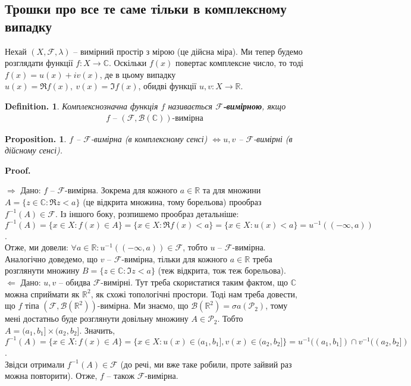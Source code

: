 \documentclass[a4paper, 10pt]{article}
\makeatletter
\def\rightproof{$\boxed{\Rightarrow}$ }
\def\leftproof{$\boxed{\Leftarrow}$ }
\theoremstyle{theoremdd}
\newtheorem*{definition*}{Definition.}
\newtheorem*{proposition*}{Proposition.}
\renewenvironment{proof}[1][Proof.\\]{\par
\pushQED{\hfill \qed}%
\normalfont \topsep6\p@\@plus6\p@\relax
\trivlist
\item\relax
{\bfseries
#1\@addpunct{.}}\hspace\labelsep\ignorespaces
}{%
\popQED\endtrivlist\@endpefalse
}
\makeatother
\begin{document}
\subsection*{Трошки про все те саме тільки в комплексному випадку}
Нехай $(X,\mathcal{F},\lambda)$ -- вимірний простір з мірою (це дійсна міра). Ми тепер будемо розглядати функції $f \colon X \to \mathbb{C}$. Оскільки $f(x)$ повертає комплексне число, то тоді $f(x) = u(x) + iv(x)$, де в цьому випадку $u(x) = \Re f(x),\ v(x) = \Im f(x)$, обидві функції $u,v \colon X \to \mathbb{R}$.

\begin{definition*}
Комплекснозначна функція $f$ називається \textbf{$\mathcal{F}$-вимірною}, якщо
\begin{align*}
f \text{ -- } (\mathcal{F},\mathcal{B}(\mathbb{C})) \text{-вимірна}
\end{align*}
\end{definition*}

\begin{proposition*}
$f$ -- $\mathcal{F}$-вимірна (в комплексному сенсі) $\iff u,v$ -- $\mathcal{F}$-вимірні (в дійсному сенсі).
\end{proposition*}

\begin{proof}
\rightproof Дано: $f$ -- $\mathcal{F}$-вимірна. Зокрема для кожного $a \in \mathbb{R}$ та для множини $A = \{z \in \mathbb{C}: \Re z < a\}$ (це відкрита множина, тому борельова) прообраз $f^{-1}(A) \in \mathcal{F}$. Із іншого боку, розпишемо прообраз детальніше:\\
$f^{-1}(A) = \{x \in X: f(x) \in A\} = \{x \in X: \Re f(x) < a\} = \{x \in X: u(x) < a\} = u^{-1}((-\infty,a))$.\\
Отже, ми довели: $\forall a \in \mathbb{R}: u^{-1}((-\infty,a)) \in \mathcal{F}$, тобто $u$ -- $\mathcal{F}$-вимірна.\\
Аналогічно доведемо, що $v$ -- $\mathcal{F}$-вимірна, тільки для кожного $a \in \mathbb{R}$ треба розглянути множину $B = \{z \in \mathbb{C}: \Im z < a\}$ (теж відкрита, тож теж борельова).
\bigskip \\
\leftproof Дано: $u,v$ -- обидва $\mathcal{F}$-вимірні. Тут треба скористатися таким фактом, що $\mathbb{C}$ можна сприймати як $\mathbb{R}^2$, як схожі топологічні простори. Тоді нам треба довести, що $f$ тіпа $(\mathcal{F},\mathcal{B}(\mathbb{R}^2))$-вимірна. Ми знаємо, що $\mathcal{B}(\mathbb{R}^2) = \sigma a(\mathcal{P}_2)$, тому мені достатньо буде розглянути довільну множину $A \in \mathcal{P}_2$. Тобто $A = (a_1,b_1] \times (a_2,b_2]$. Значить,\\
$f^{-1}(A) = \{ x \in X: f(x) \in A \} = \{x \in X: u(x) \in (a_1,b_1], v(x) \in (a_2,b_2]\} = u^{-1}((a_1,b_1]) \cap v^{-1}((a_2,b_2])$.\\
Звідси отримали $f^{-1}(A) \in \mathcal{F}$ (до речі, ми вже таке робили, проте зайвий раз можна повторити). Отже, $f$ -- також $\mathcal{F}$-вимірна.
\end{proof}
\end{document}
